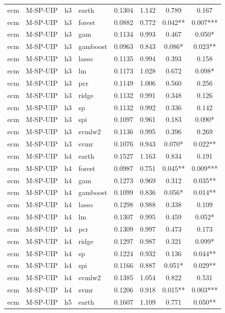 \begin{ThreePartTable}
\begin{longtable}[t]{llclcccc}
\addlinespace
ecm & M-SP-UIP & h3 & earth & 0.1304 & 1.142 & 0.789 & 0.167\\
ecm & M-SP-UIP & h3 & forest & 0.0882 & 0.772 & 0.042** & 0.007***\\
ecm & M-SP-UIP & h3 & gam & 0.1134 & 0.993 & 0.467 & 0.050*\\
ecm & M-SP-UIP & h3 & gamboost & 0.0963 & 0.843 & 0.086* & 0.023**\\
ecm & M-SP-UIP & h3 & lasso & 0.1135 & 0.994 & 0.393 & 0.158\\
ecm & M-SP-UIP & h3 & lm & 0.1173 & 1.028 & 0.672 & 0.098*\\
ecm & M-SP-UIP & h3 & pcr & 0.1149 & 1.006 & 0.560 & 0.256\\
ecm & M-SP-UIP & h3 & ridge & 0.1132 & 0.991 & 0.348 & 0.126\\
ecm & M-SP-UIP & h3 & sp & 0.1132 & 0.992 & 0.336 & 0.142\\
ecm & M-SP-UIP & h3 & spi & 0.1097 & 0.961 & 0.183 & 0.090*\\
ecm & M-SP-UIP & h3 & svmlw2 & 0.1136 & 0.995 & 0.396 & 0.269\\
ecm & M-SP-UIP & h3 & svmr & 0.1076 & 0.943 & 0.070* & 0.022**\\
\addlinespace
ecm & M-SP-UIP & h4 & earth & 0.1527 & 1.163 & 0.834 & 0.191\\
ecm & M-SP-UIP & h4 & forest & 0.0987 & 0.751 & 0.045** & 0.009***\\
ecm & M-SP-UIP & h4 & gam & 0.1273 & 0.969 & 0.312 & 0.035**\\
ecm & M-SP-UIP & h4 & gamboost & 0.1099 & 0.836 & 0.056* & 0.014**\\
ecm & M-SP-UIP & h4 & lasso & 0.1298 & 0.988 & 0.338 & 0.109\\
ecm & M-SP-UIP & h4 & lm & 0.1307 & 0.995 & 0.459 & 0.052*\\
ecm & M-SP-UIP & h4 & pcr & 0.1309 & 0.997 & 0.473 & 0.173\\
ecm & M-SP-UIP & h4 & ridge & 0.1297 & 0.987 & 0.321 & 0.099*\\
ecm & M-SP-UIP & h4 & sp & 0.1224 & 0.932 & 0.136 & 0.044**\\
ecm & M-SP-UIP & h4 & spi & 0.1166 & 0.887 & 0.051* & 0.029**\\
ecm & M-SP-UIP & h4 & svmlw2 & 0.1385 & 1.054 & 0.822 & 0.531\\
ecm & M-SP-UIP & h4 & svmr & 0.1206 & 0.918 & 0.015** & 0.003***\\
\addlinespace
ecm & M-SP-UIP & h5 & earth & 0.1607 & 1.109 & 0.771 & 0.050**\\

\end{longtable}
\end{ThreePartTable}
